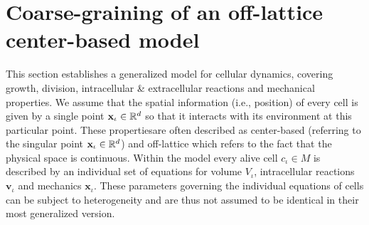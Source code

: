 %

\section{Coarse-graining of an off-lattice center-based model}
\label{subsection:coarse-graining-of-cbm-model}
This section establishes a generalized model for cellular dynamics, covering growth, division,
intracellular \& extracellular reactions and mechanical properties.
We assume that the spatial information (i.e., position) of every cell is given by a single point
$\mathbf{x}_\iota\in\mathbb{R}^d$ so that it interacts with its environment at this particular point.
These propertiesare often described as center-based (referring to the singular point
$\mathbf{x}_\iota\in\mathbb{R}^d$) and off-lattice which refers to the fact that the physical space is
continuous.
Within the model every alive cell $c_\iota\in M$ is described by an individual set of
equations for volume $V_\iota$, intracellular reactions $\textbf{v}_\iota$ and mechanics
$\textbf{x}_\iota$.
These parameters governing the individual equations of cells can be subject to heterogeneity and are
thus not assumed to be identical in their most generalized version.

